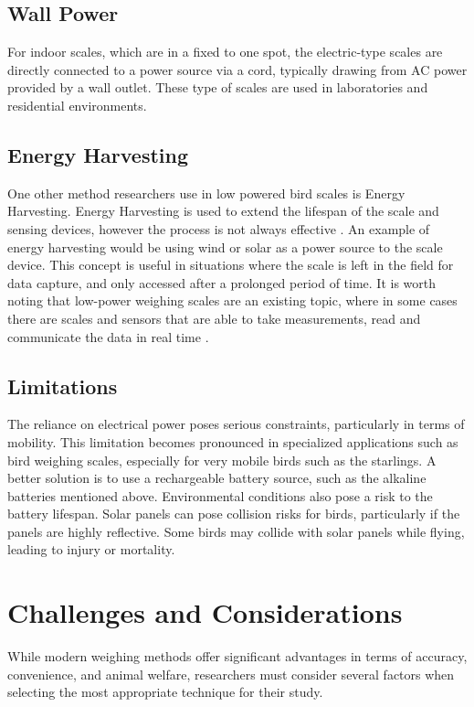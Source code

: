 \documentclass[class=report,11pt,crop=false]{standalone}
\begin{document}
\subsection{Wall Power}
For indoor scales, which are in a fixed to one spot, the electric-type scales are directly connected to a power source via a cord, typically drawing from AC power provided by a wall outlet. These type of scales are used in laboratories and residential environments. 

\subsection{Energy Harvesting}
One other method researchers use in low powered bird scales is Energy Harvesting. Energy Harvesting is used to extend the lifespan of the scale and sensing devices, however the process is not always effective \cite{EnergyHarvesting}. An example of energy harvesting would be using wind or solar as a power source to the scale device. This concept is useful in situations where the scale is left in the field for data capture, and only accessed after a prolonged period of time. It is worth noting that low-power weighing scales are an existing topic, where in some cases there are scales and sensors that are able to take measurements, read and communicate the data in real time \cite{ImageBased}. 

\subsection{Limitations}
The reliance on electrical power poses serious constraints, particularly in terms of mobility. This limitation becomes pronounced in specialized applications such as bird weighing scales, especially for very mobile birds such as the starlings. A better solution is to use a rechargeable battery source, such as the alkaline batteries mentioned above. Environmental conditions also pose a risk to the battery lifespan. Solar panels can pose collision risks for birds, particularly if the panels are highly reflective. Some birds may collide with solar panels while flying, leading to injury or mortality.
 

\section{Challenges and Considerations}
While modern weighing methods offer significant advantages in terms of accuracy, convenience, and animal welfare, researchers must consider several factors when selecting the most appropriate technique for their study.
\end{document}
